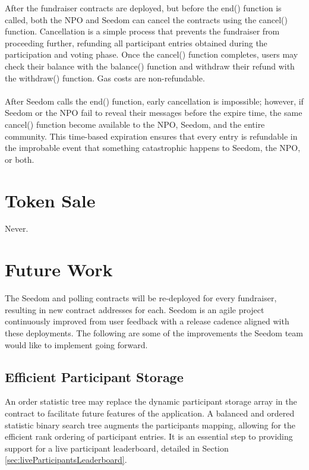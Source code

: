 \documentclass[11pt]{article}
\begin{document}
After the fundraiser contracts are deployed, but before the end() function is called, both the NPO and Seedom can cancel the contracts using the cancel() function. Cancellation is a simple process that prevents the fundraiser from proceeding further, refunding all participant entries obtained during the participation and voting phase. Once the cancel() function completes, users may check their balance with the balance() function and withdraw their refund with the withdraw() function. Gas costs are non-refundable.\\\\
After Seedom calls the end() function, early cancellation is impossible; however, if Seedom or the NPO fail to reveal their messages before the expire time, the same cancel() function become available to the NPO, Seedom, and the entire community. This time-based expiration ensures that every entry is refundable in the improbable event that something catastrophic happens to Seedom, the NPO, or both.

\section{Token Sale}
Never.

\section{Future Work}

The Seedom and polling contracts will be re-deployed for every fundraiser, resulting in new contract addresses for each. Seedom is an agile project continuously improved from user feedback with a release cadence aligned with these deployments. The following are some of the improvements the Seedom team would like to implement going forward.

\subsection{Efficient Participant Storage}

An order statistic tree \cite{5} may replace the dynamic participant storage array in the contract to facilitate future features of the application. A balanced and ordered statistic binary search tree augments the participants mapping, allowing for the efficient rank ordering of participant entries. It is an essential step to providing support for a live participant leaderboard, detailed in Section \ref{sec:liveParticipantsLeaderboard}.
\end{document}
